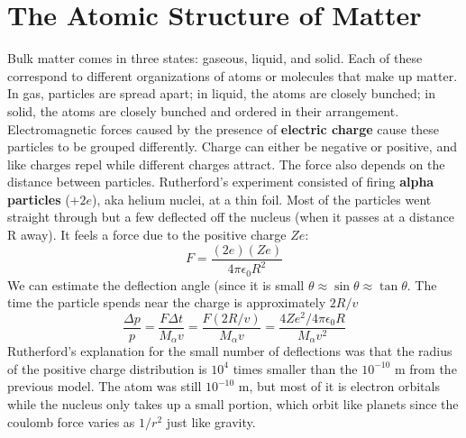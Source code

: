 \section{The Atomic Structure of Matter}
    Bulk matter comes in three states: gaseous, liquid, and solid. Each of these correspond to different organizations of atoms or molecules that make up matter. In gas, particles are spread apart; in liquid, the atoms are closely bunched; in solid, the atoms are closely bunched and ordered in their arrangement. Electromagnetic forces caused by the presence of \textbf{electric charge} cause these particles to be grouped differently. Charge can either be negative or positive, and like charges repel while different charges attract. The force also depends on the distance between particles.
    \newline \indent
    Rutherford's experiment consisted of firing \textbf{alpha particles} (+$2e$), aka helium nuclei, at a thin foil. Most of the particles went straight through but a few deflected off the nucleus (when it passes at a distance R away). It feels a force due to the positive charge $Ze$:
    \begin{equation*}
        F = \frac{(2e)(Ze)}{4\pi\epsilon_0R^2}
    \end{equation*}
    We can estimate the deflection angle (since it is small $\theta \approx \sin\theta \approx \tan\theta$. The time the particle spends near the charge is approximately $2R/v$
    \begin{equation*}
        \frac{\Delta p}{p} = \frac{F\Delta t}{M_\alpha v}=\frac{F(2R/v)}{M_\alpha v}=\frac{4Ze^2/4\pi\epsilon_0R}{M_\alpha v^2}
    \end{equation*}
    Rutherford's explanation for the small number of deflections was that the radius of the positive charge distribution is $10^4$ times smaller than the $10^{-10}$ m from the previous model. The atom was still $10^{-10}$ m, but most of it is electron orbitals while the nucleus only takes up a small portion, which orbit like planets since the coulomb force varies as $1/r^2$ just like gravity.